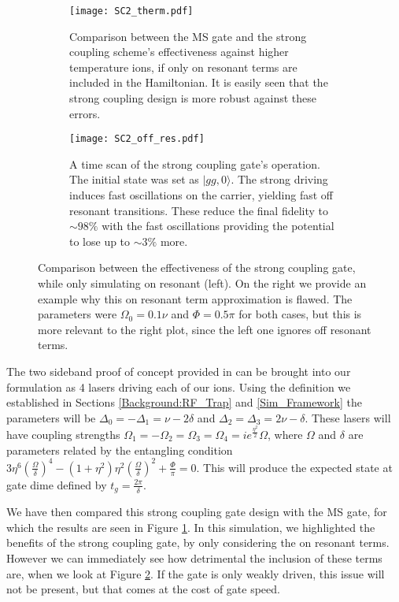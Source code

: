 \documentclass[12pt,twoside]{report}
\begin{document}
\begin{figure}[t!]
	\centering
	\begin{subfigure}[t]{0.475\textwidth}
		\centering
		\texttt{[image: SC2\_therm.pdf]}
		\caption{Comparison between the MS gate and the strong coupling scheme's effectiveness against higher temperature ions, if only on resonant terms are included in the Hamiltonian. It is easily seen that the strong coupling design is more robust against these errors.}
		\label{fig:sc2:comparison}
	\end{subfigure}
	\hfill
	\begin{subfigure}[t]{0.475\textwidth}
		\centering
		\texttt{[image: SC2\_off\_res.pdf]}
		\caption{A time scan of the strong coupling gate's operation. The initial state was set as $|gg,0\rangle$. The strong driving induces fast oscillations on the carrier, yielding fast off resonant transitions. These reduce the final fidelity to $\sim 98\%$ with the fast oscillations providing the potential to lose up to $\sim3\%$ more.}
		\label{fig:sc2:time}
	\end{subfigure}
	\caption[Strong coupling design]{Comparison between the effectiveness of the strong coupling gate, while only simulating on resonant (left). On the right we provide an example why this on resonant term approximation is flawed. The parameters were $\Omega_0 = 0.1\nu$ and $\Phi=0.5\pi$ for both cases, but this is more relevant to the right plot, since the left one ignores off resonant terms.}
	\label{fig:sc2}
\end{figure}

The two sideband proof of concept provided in \cite{SC_Paper} can be brought into our formulation as 4 lasers driving each of our ions. Using the definition we established in Sections \ref{Background:RF_Trap} and \ref{Sim_Framework} the parameters will be $\Delta_0 = -\Delta_1 = \nu - 2\delta$ and $\Delta_2 = \Delta_3 = 2\nu-\delta$. These lasers will have coupling strengths ${\Omega_1 = -\Omega_2 = \Omega_3 = \Omega_4 = ie^{\frac{\eta^2}{2}}\Omega}$, where $\Omega$ and $\delta$ are parameters related by the entangling condition ${3\eta^6(\frac{\Omega}{\delta})^4 - (1 + \eta^2)\eta^2(\frac{\Omega}{\delta})^2 + \frac{\Phi}{\pi} = 0}$. This will produce the expected state at gate dime defined by $t_g = \frac{2\pi}{\delta}$.

We have then compared this strong coupling gate design with the MS gate, for which the results are seen in Figure \ref{fig:sc2:comparison}. In this simulation, we highlighted the benefits of the strong coupling gate, by only considering the on resonant terms. However we can immediately see how detrimental the inclusion of these terms are, when we look at Figure \ref{fig:sc2:time}. If the gate is only weakly driven, this issue will not be present, but that comes at the cost of gate speed.
\end{document}
